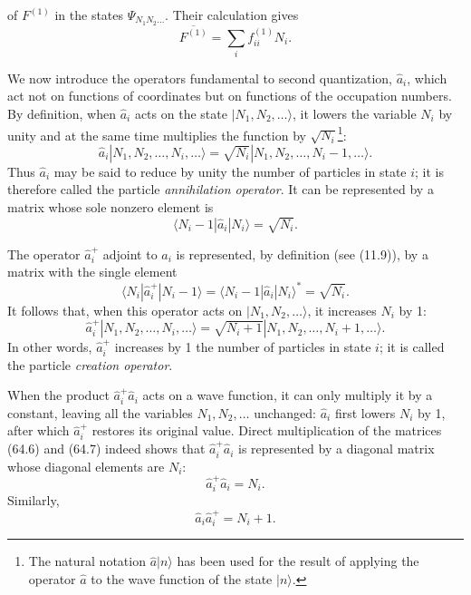 of $F^{(1)}$ in the states $\Psi_{N_1N_2\ldots}$. Their calculation gives
\begin{equation}
 \overline{F^{(1)}}=\sum_i f_{ii}^{(1)}N_i.
 \tag{64.4}
\end{equation}

We now introduce the operators fundamental to second quantization, $\hat a_i$, which act not on functions of coordinates but on functions of the occupation numbers. By definition, when $\hat a_i$ acts on the state $|N_1,N_2,\ldots\rangle$, it lowers the variable $N_i$ by unity and at the same time multiplies the function by $\sqrt{N_i}$\footnote{The natural notation $\hat a|n\rangle$ has been used for the result of applying the operator $\hat a$ to the wave function of the state $|n\rangle$.}:
\begin{equation}
 \hat a_i|N_1,N_2,\ldots,N_i,\ldots\rangle
 =\sqrt{N_i}|N_1,N_2,\ldots,N_i-1,\ldots\rangle.
 \tag{64.5}
\end{equation}
Thus $\hat a_i$ may be said to reduce by unity the number of particles in state $i$; it is therefore called the particle \emph{annihilation operator}. It can be represented by a matrix whose sole nonzero element is
\begin{equation}
 \langle N_i-1|\hat a_i|N_i\rangle=\sqrt{N_i}.
 \tag{64.6}
\end{equation}

The operator $\hat a_i^+$ adjoint to $\hat a_i$ is represented, by definition (see (11.9)), by a matrix with the single element
\begin{equation}
 \langle N_i|\hat a_i^+|N_i-1\rangle
 =\langle N_i-1|\hat a_i|N_i\rangle^*=\sqrt{N_i}.
 \tag{64.7}
\end{equation}
It follows that, when this operator acts on $|N_1,N_2,\ldots\rangle$, it increases $N_i$ by 1:
\begin{equation}
 \hat a_i^+|N_1,N_2,\ldots,N_i,\ldots\rangle
 =\sqrt{N_i+1}|N_1,N_2,\ldots,N_i+1,\ldots\rangle.
 \tag{64.8}
\end{equation}
In other words, $\hat a_i^+$ increases by 1 the number of particles in state $i$; it is called the particle \emph{creation operator}.

When the product $\hat a_i^+\hat a_i$ acts on a wave function, it can only multiply it by a constant, leaving all the variables $N_1,N_2,\ldots$ unchanged: $\hat a_i$ first lowers $N_i$ by 1, after which $\hat a_i^+$ restores its original value. Direct multiplication of the matrices (64.6) and (64.7) indeed shows that $\hat a_i^+\hat a_i$ is represented by a diagonal matrix whose diagonal elements are $N_i$:
\begin{equation}
 \hat a_i^+\hat a_i=N_i.
 \tag{64.9}
\end{equation}
Similarly,
\begin{equation}
 \hat a_i\hat a_i^+=N_i+1.
 \tag{64.10}
\end{equation}

